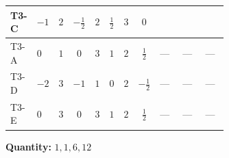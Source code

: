 \documentclass[8pt]{article}
\begin{document}
\begin{landscape}
\begin{longtable}{@{}llcccccc >{\raggedright\arraybackslash}p{0.21\linewidth} >{\raggedright\arraybackslash}p{0.21\linewidth} >{\raggedright\arraybackslash}p{0.21\linewidth}@{}}
T3-C & $-1$ & $2$ & $-\frac{1}{2}$ & $2$ & $\frac{1}{2}$ & $3$ & $0$ & \scriptsize\adjustbox{max width=\linewidth}{$\begin{gathered} \frac{lambda12Inv2 \overline{y_{1}} \overline{y_{2}}}{3 MF}\end{gathered}$} & \scriptsize\adjustbox{max width=\linewidth}{$\begin{gathered} \frac{\sqrt{3} g_{2}^{2} \overline{y_{1}} \overline{y_{2}}}{4 MF}\end{gathered}$} & \scriptsize\adjustbox{max width=\linewidth}{$\begin{gathered} - \frac{\sqrt{3} ye \overline{y_{1}} \overline{y_{2}} \overline{ye}}{12 MF}\end{gathered}$} \\
\midrule
T3-A & $0$ & $1$ & $0$ & $3$ & $1$ & $2$ & $\frac{1}{2}$ & --- & --- & --- \\
\midrule
T3-D & $-2$ & $3$ & $-1$ & $1$ & $0$ & $2$ & $-\frac{1}{2}$ & --- & --- & --- \\
\midrule
T3-E & $0$ & $3$ & $0$ & $3$ & $1$ & $2$ & $\frac{1}{2}$ & --- & --- & --- \\
\midrule
\bottomrule
\end{longtable}
\clearpage
\noindent\textbf{Quantity: }$\mathrm{1,1,6,12}$\par\smallskip

\end{landscape}
\end{document}
